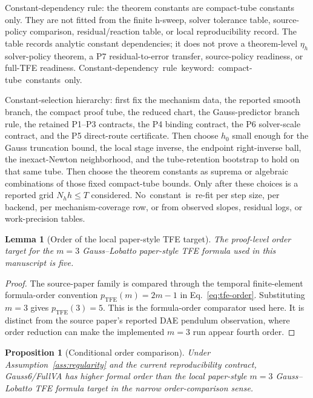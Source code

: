 \documentclass[preprint,12pt]{elsarticle}
\newtheorem{lemma}{Lemma}
\newtheorem{proposition}{Proposition}
\newcommand{\method}{Gauss6\slash FullVA}
\newcommand{\tfe}{TFE}
\begin{document}
Constant-dependency rule: the theorem constants are
compact-tube constants only. They are not fitted from the finite h-sweep,
solver tolerance table, source-policy comparison, residual/reaction table, or
local reproducibility record. The table records analytic constant dependencies; it
does not prove a theorem-level \(\eta_h\) solver-policy theorem, a P7
residual-to-error transfer, source-policy readiness, or full-TFE readiness.
\mbox{Constant-dependency rule keyword: compact-tube constants only.}

Constant-selection hierarchy: first fix the mechanism data, the
reported smooth branch, the compact proof tube, the reduced chart, the
Gauss-predictor branch rule, the retained P1--P3 contracts, the P4 binding
contract, the P6 solver-scale contract, and the P5 direct-route certificate.
Then choose \(h_0\) small
enough for the Gauss truncation bound, the local
stage inverse, the endpoint right-inverse ball, the inexact-Newton
neighborhood, and the tube-retention bootstrap to hold on that same tube.
Then choose the theorem constants as suprema or algebraic combinations of
those fixed compact-tube bounds. Only after these choices is a reported grid
\(N_hh\le T\) considered. \mbox{No constant is re-fit} per step size, per backend,
per mechanism-coverage row, or from observed slopes, residual logs, or
work-precision tables.

\begin{lemma}[Order of the local paper-style \tfe{} target]
\label{lem:tfe-target-order}
The proof-level order target for the $m=3$ Gauss--Lobatto paper-style
\tfe{} formula used in this manuscript is five.
\end{lemma}

\begin{proof}
The source-paper family is compared through the temporal finite-element
formula-order convention
$p_{\mathrm{TFE}}(m)=2m-1$ in Eq.~\eqref{eq:tfe-order}. Substituting
$m=3$ gives $p_{\mathrm{TFE}}(3)=5$. This is the formula-order comparator
used here. It is distinct from the source paper's reported DAE pendulum
observation, where order reduction can make the implemented $m=3$ run appear
fourth order.
\end{proof}

\begin{proposition}[Conditional order comparison]
\label{prop:order-comparison}
Under Assumption~\ref{ass:regularity} and the current reproducibility
contract,
\method{} has higher formal order than the local paper-style
$m=3$ Gauss--Lobatto \tfe{} formula target in the narrow order-comparison
sense.
\end{proposition}
\end{document}
